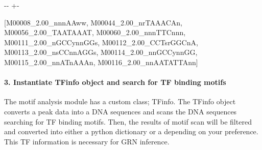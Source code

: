 \documentclass[letterpaper,10pt,english]{sphinxmanual}
\newlength\nbsphinxcodecellspacing
\begin{document}
{
\begin{sphinxVerbatim}[commandchars=\\\{\}]
\llap{\color{nbsphinxin}[12]:\,\hspace{\fboxrule}\hspace{\fboxsep}}
  

\PYG{p}{[}\PYG{p}{]}
\end{sphinxVerbatim}
}

{

\kern-\sphinxverbatimsmallskipamount\kern-\baselineskip
\kern+\FrameHeightAdjust\kern-\fboxrule
\vspace{\nbsphinxcodecellspacing}

\begin{sphinxVerbatim}[commandchars=\\\{\}]
\llap{\color{nbsphinxout}[12]:\,\hspace{\fboxrule}\hspace{\fboxsep}}[M00008\_2.00\_nnnAAww,
 M00044\_2.00\_nrTAAACAn,
 M00056\_2.00\_TAATAAAT,
 M00060\_2.00\_nnnTTCnnn,
 M00111\_2.00\_nGCCynnGGs,
 M00112\_2.00\_CCTsrGGCnA,
 M00113\_2.00\_nsCCnnAGGs,
 M00114\_2.00\_nnGCCynnGG,
 M00115\_2.00\_nnATnAAAn,
 M00116\_2.00\_nnAATATTAnn]
\end{sphinxVerbatim}
}


\paragraph{3. Instantiate TFinfo object and search for TF binding motifs}
\label{\detokenize{notebooks/02_motif_scan/02_atac_peaks_to_TFinfo_with_celloracle_20200801:3.-Instantiate-TFinfo-object-and-search-for-TF-binding-motifs}}
The motif analysis module has a custom class; TFinfo. The TFinfo object converts a peak data into a DNA sequences and scans the DNA sequences searching for TF binding motifs. Then, the results of motif scan will be filtered and converted into either a python dictionary or a depending on your preference. This TF information is necessary for GRN inference.
\end{document}
